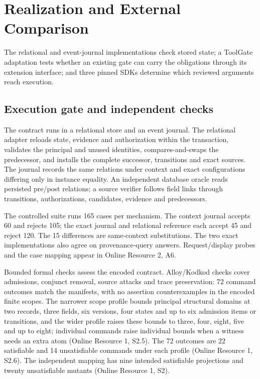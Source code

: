 \documentclass[pdflatex,sn-basic]{sn-jnl}
\begin{document}
\section{Realization and External Comparison}\label{realization-and-external-comparison}

The relational and event-journal implementations check stored state; a ToolGate adaptation tests whether an existing gate can carry the obligations through its extension interface; and three pinned SDKs determine which reviewed arguments reach execution.

\subsection{Execution gate and independent checks}\label{execution-gate-and-independent-checks}

The contract runs in a relational store and an event journal. The relational adapter reloads state, evidence and authorization within the transaction, validates the principal and unused identities, compares-and-swaps the predecessor, and installs the complete successor, transitions and exact sources. The journal records the same relations under context and exact configurations differing only in instance equality. An independent database oracle reads persisted pre/post relations; a source verifier follows field links through transitions, authorizations, candidates, evidence and predecessors.

The controlled suite runs 165 cases per mechanism. The context journal accepts 60 and rejects 105; the exact journal and relational reference each accept 45 and reject 120. The 15 differences are same-context substitutions. The two exact implementations also agree on provenance-query answers. Request/display probes and the case mapping appear in Online Resource 2, A6.

Bounded formal checks assess the encoded contract. Alloy/Kodkod checks \citep{alloy,kodkod} cover admissions, conjunct removal, source attacks and trace preservation: 72 command outcomes match the manifests, with no assertion counterexamples in the encoded finite scopes. The narrower scope profile bounds principal structural domains at two records, three fields, six versions, four states and up to six admission items or transitions, and the wider profile raises these bounds to three, four, eight, five and up to eight; individual commands raise individual bounds when a witness needs an extra atom (Online Resource 1, S2.5). The 72 outcomes are 22 satisfiable and 14 unsatisfiable commands under each profile (Online Resource 1, S2.6). The independent mapping has nine intended satisfiable projections and twenty unsatisfiable mutants (Online Resource 1, S2).
\end{document}
